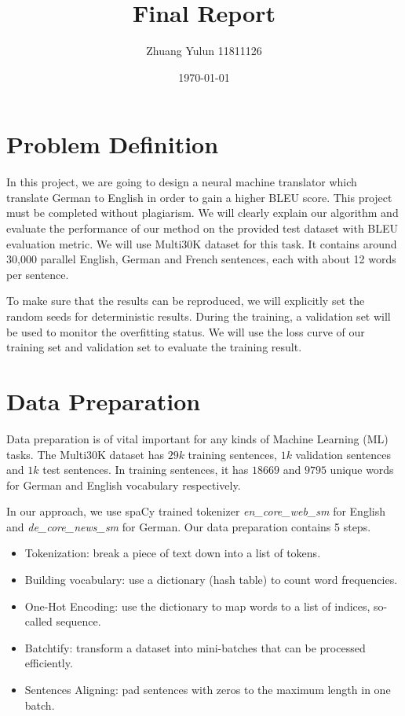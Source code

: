 \documentclass{article}
\title{Final Report}
\author{Zhuang Yulun 11811126}
\date{\today}
\begin{document}
\maketitle

\section{Problem Definition}
In this project, we are going to design a neural machine translator which translate German to English in order to gain a higher BLEU score. This project must be completed without plagiarism. We will clearly explain our algorithm and evaluate the performance of our method on the provided test dataset with BLEU evaluation metric. We will use Multi30K dataset for this task. It contains around 30,000 parallel English, German and French sentences, each with about 12 words per sentence.

To make sure that the results can be reproduced, we will explicitly set the random seeds for deterministic results. During the training, a validation set will be used to monitor the overfitting status. We will use the loss curve of our training set and validation set to evaluate the training result.

\section{Data Preparation}
Data preparation is of vital important for any kinds of Machine Learning (ML) tasks. The Multi30K dataset has $29k$ training sentences, $1k$ validation sentences and $1k$ test sentences. In training sentences, it has $18669$ and $9795$ unique words for German and English vocabulary respectively.

In our approach, we use spaCy trained tokenizer \textit{en\_core\_web\_sm} for English and \textit{de\_core\_news\_sm} for German. Our data preparation contains 5 steps.

\begin{itemize}
    \item Tokenization: break a piece of text down into a list of tokens.
    \item Building vocabulary: use a dictionary (hash table) to count word frequencies.
    \item One-Hot Encoding: use the dictionary to map words to a list of indices, so-called sequence.
    \item Batchtify: transform a dataset into mini-batches that can be processed efficiently.
    \item Sentences Aligning: pad sentences with zeros to the maximum length in one batch.
\end{itemize}
\end{document}

